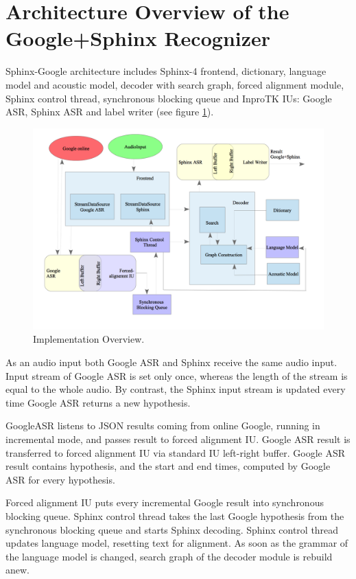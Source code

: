 \section {Architecture Overview of the Google+Sphinx Recognizer}
Sphinx-Google architecture includes Sphinx-4 frontend, dictionary,
language model and acoustic model, decoder with search graph, forced alignment
module, Sphinx control thread, synchronous blocking queue and InproTK IUs:
Google ASR, Sphinx ASR and label writer (see figure \ref {fig:arch}).
\begin{figure}[htbp]
  \centering
    \includegraphics[width=1\textwidth]{images/architecture.png}
 \caption{Implementation Overview.}
  \label{fig:arch}
\end {figure} 

As an audio input both Google ASR and Sphinx receive the same audio input.
Input stream of Google ASR is set only once, whereas the length of
the stream is equal to the whole audio. By contrast, the Sphinx input stream is
updated every time Google ASR returns a new hypothesis.  


GoogleASR listens to JSON results coming from online Google, running
in incremental mode, and passes result to forced alignment IU. Google ASR result
is transferred to forced alignment IU via standard IU left-right buffer. Google
ASR result contains hypothesis, and the start and end times, computed by Google
ASR for every hypothesis. 

Forced alignment IU puts every incremental Google result into synchronous
blocking queue. Sphinx control thread takes the last Google hypothesis from the
synchronous blocking queue and starts Sphinx decoding. Sphinx control thread
updates language model, resetting text for alignment. As soon as the grammar of
the language model is changed, search graph of the decoder module is rebuild
anew. 


